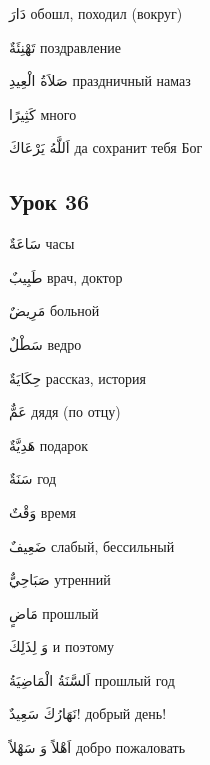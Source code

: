 \documentclass[a5paper]{article}
\newcommand\textstyleDropCaps[1]{#1}
\newcommand\textstyleCaptioncharacters[1]{#1}
\begin{document}
\textstyleCaptioncharacters{دَارَ }\textstyleDropCaps{обошл, походил (во­круг)‎}

\textstyleCaptioncharacters{تَهْنِئَةٌ }\textstyleDropCaps{поздравление‎}

\textstyleCaptioncharacters{صَلاَةُ الْعِيدِ }\textstyleDropCaps{празднич­ный намаз‎}

\textstyleCaptioncharacters{كَثِيرًا }\textstyleDropCaps{много‎}

\textstyleCaptioncharacters{اَللَّهُ يَرْعَاكَ }\textstyleDropCaps{да сохранит тебя Бог‎}

\subsection[Урок 36‎]{\textstyleDropCaps{Урок 36‎}}
\textstyleCaptioncharacters{سَاعَةٌ }\textstyleDropCaps{часы‎}

\textstyleCaptioncharacters{طَبِيبٌ }\textstyleDropCaps{врач, доктор‎}

\textstyleCaptioncharacters{مَرِيضٌ }\textstyleDropCaps{больной‎}

\textstyleCaptioncharacters{سَطْلٌ }\textstyleDropCaps{ведро‎}

\textstyleCaptioncharacters{حِكَايَةٌ }\textstyleDropCaps{рассказ, история‎}

\textstyleCaptioncharacters{عَمٌّ }\textstyleDropCaps{дядя (по отцу)‎}

\textstyleCaptioncharacters{هَدِيَّةٌ }\textstyleDropCaps{подарок‎}

\textstyleCaptioncharacters{سَنَةٌ }\textstyleDropCaps{год‎}

\textstyleCaptioncharacters{وَقْتٌ }\textstyleDropCaps{время‎}

\textstyleCaptioncharacters{ضَعِيفٌ }\textstyleDropCaps{слабый, бессиль­ный‎}

\textstyleCaptioncharacters{صَبَاحِيٌّ }\textstyleDropCaps{утренний‎}

\textstyleCaptioncharacters{مَاضٍ }\textstyleDropCaps{прошлый‎}

\textstyleCaptioncharacters{وَ لِذَلِكَ }\textstyleDropCaps{и поэтому‎}

\textstyleCaptioncharacters{اَلسَّنَةُ الْمَاضِيَةُ }\textstyleDropCaps{прош­лый год‎}

\textstyleCaptioncharacters{نَهَارُكَ سَعِيدٌ!ِ }\textstyleDropCaps{добрый день!‎}

\textstyleCaptioncharacters{اَهْلاً وَ سَهْلاً }\textstyleDropCaps{добро по­жаловать‎}
\end{document}
